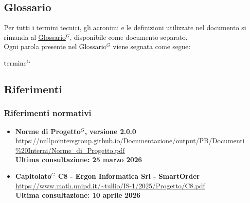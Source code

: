 \subsection{Glossario}
Per tutti i termini tecnici, gli acronimi e le definizioni utilizzate nel documento si rimanda al \underline{\href{https://nullpointersgroup.github.io/Documentazione/output/PB/Documenti\%20Interni/Glossario.pdf}{Glossario$^G$}}, disponibile come documento separato.\\
Ogni parola presente nel Glossario$^G$ viene segnata come segue:
\begin{center}
	termine$^{G}$
\end{center}


\subsection{Riferimenti}
\subsubsection{Riferimenti normativi}

\begin{itemize}[itemsep=5pt, parsep=5pt, label=$\scriptstyle\bullet$]

	\item \textbf{Norme di Progetto$^G$, versione 2.0.0}\\
	\url{https://nullpointersgroup.github.io/Documentazione/output/PB/Documenti%20Interni/Norme_di_Progetto.pdf}\\[3pt]
	\textbf{Ultima consultazione: 25 marzo 2026}
	
	\item \textbf{Capitolato$^G$ C8 - Ergon Informatica Srl - SmartOrder}\\
	\url{https://www.math.unipd.it/~tullio/IS-1/2025/Progetto/C8.pdf}\\[3pt]
	\textbf{Ultima consultazione: 10 aprile 2026}

\end{itemize}

